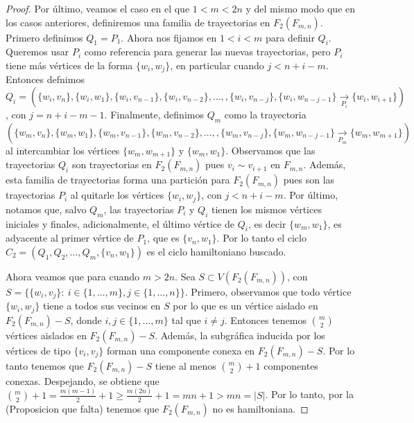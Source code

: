 \begin{proof}
    Por \'ultimo, veamos el caso en el que $1<m<2n$ y del mismo modo que en los
    casos anteriores, definiremos una familia de trayectorias en $F_2(F_{m,n})$.
    Primero definimos $Q_1 =P_1$. Ahora nos fijamos en $1<i<m$ para definir
    $Q_i$. Queremos usar $P_i$ como referencia para generar las nuevas
    trayectorias, pero $P_i$ tiene m\'as v\'ertices de la forma $\{w_i,w_j\}$,
    en particular cuando $j< n+i-m$. Entonces defnimos $Q_i =
    (\{w_i,v_n\},\{w_i,w_1\},\{w_i,v_{n-1}\},\{w_i,v_{n-2}\}, \dots,
    ,\{w_i,v_{n-j}\},\{w_i,w_{n-j-1}\}\xrightarrow[P_i]{}\{w_i,w_{i+1}\})$, con
    $j = n+i-m-1$. Finalmente, definimos $Q_m$ como la trayectoria
    $(\{w_m,v_n\},\{w_m,w_1\},\{w_m,v_{n-1}\},\{w_m,v_{n-2}\}, \dots,
    ,\{w_m,v_{n-j}\},\{w_m,w_{n-j-1}\}\xrightarrow[P_m]{}\{w_m,w_{m+1}\})$ al
    intercambiar los v\'ertices $\{w_m,w_{m+1}\}$ y $\{w_m,w_1\}$. Observamos
    que las trayectorias $Q_i$ son trayectorias en $F_2(F_{m,n})$ pues $v_i \sim
    v_{i+1}$ en $F_{m,n}$. Adem\'as, esta familia de trayectorias forma una
    partici\'on para $F_2(F_{m,n})$ pues son las trayectorias $P_i$ al quitarle
    los v\'ertices $\{w_i,w_j\}$, con $j< n+i-m$. Por \'ultimo, notamos que,
    salvo $Q_m$, las trayectorias $P_i$ y $Q_i$ tienen los mismos v\'ertices
    iniciales y finales, adicionalmente, el \'ultimo v\'ertice de $Q_i$, es
    decir $\{w_m,w_1\}$, es adyacente al primer v\'ertice de $P_1$, que es
    $\{v_n,w_1\}$. Por lo tanto el ciclo $C_2=(Q_1,Q_2, \dots, Q_m,
    \{v_n,w_1\})$ es el ciclo hamiltoniano buscado.

    Ahora veamos que para cuando $m>2n$. Sea $S \subset V(F_2(F_{m,n}))$, con
    $S=\{\{w_i,v_j\} \colon\ i \in \{1,\dots,m\},j\in\{1,\dots,n\}\}$. Primero,
    observamos que todo v\'ertice $\{w_i,w_j\}$ tiene a todos sus vecinos en $S$
    por lo que es un v\'ertice aislado en $F_2(F_{m,n})-S$, donde $i,j \in
    \{1,\dots,m\}$ tal que $i \neq j$. Entonces tenemos $\binom{m}{2}$
    v\'ertices aislados en $F_2(F_{m,n})-S$. Adem\'as, la subgr\'afica inducida
    por los v\'ertices de tipo $\{v_i,v_j\}$ forman una componente conexa en
    $F_2(F_{m,n})-S$. Por lo tanto tenemos que $F_2(F_{m,n})-S$ tiene al menos
    $\binom{m}{2} + 1$ componentes conexas. Despejando, se obtiene que
    $\binom{m}{2} + 1 = \frac{m(m-1)}{2} + 1 \geq \frac{m(2n)}{2} + 1 = mn + 1 >
    mn = |S|$. Por lo tanto, por la (Proposicion que falta) tenemos que
    $F_2(F_{m,n})$ no es hamiltoniana.


        

\end{proof}
